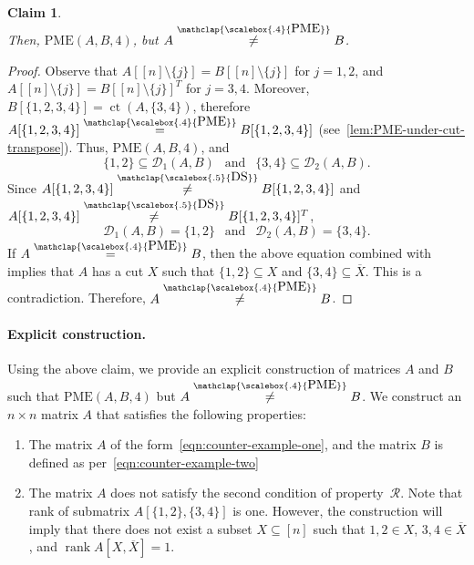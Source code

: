 \documentclass[11pt,letterpaper]{article}
\DeclareMathOperator*{\tw}{ct}
\DeclareMathOperator*{\rank}{rank}
\newcommand{\comp}[1]{\overline{#1}}
\newtheorem{claim}{Claim}[section]
\newcommand{\nDS}{\stackrel{\mathclap{\scalebox{.5}{\mbox{DS}}}}{\neq}}
\newcommand{\PME}{\stackrel{\mathclap{\scalebox{.4}{\mbox{PME}}}}{=}}
\newcommand{\nPME}{\stackrel{\mathclap{\scalebox{.4}{\mbox{PME}}}}{\neq}}
\newcommand{\kPME}[3]{\mathrm{PME}(#1, #2, #3)}
\newcommand{\nsubset}[1]{[n]\setminus\{#1\}}
\newcommand{\calD}{\mathcal{D}}
\newcommand{\prop}{\mathcal{R}}
\begin{document}
{{{{\begin{claim}
\begin{equation}
\end{equation}
Then, $\kPME{A}{B}{4}$, but $A\nPME B$.
\end{claim}
\begin{proof}
Observe that $A[\nsubset{j}]=B[\nsubset{j}]$ for $j=1,2$, and $A[\nsubset{j}]=B[\nsubset{j}]^T$ for $j=3,4$. Moreover, $B[\{1,2,3,4\}]=\tw\left(A, \{3,4\}\right)$, therefore $A[\{1,2,3,4\}]\PME B[\{1,2,3,4\}]$ (see~\cref{lem:PME-under-cut-transpose}). Thus, $\kPME{A}{B}{4}$, and $$\{1,2\}\subseteq \calD_1(A,B)\ \ \text{ and }\ \ \{3,4\}\subseteq \calD_2(A,B).$$ Since $A[\{1,2,3,4\}]\nDS B[\{1,2,3,4\}]$ and $A[\{1,2,3,4\}]\nDS B[\{1,2,3,4\}]^T$, $$ \calD_1(A,B)=\{1,2\}\ \ \text{ and }\ \ \calD_2(A,B)=\{3,4\}.$$ If $A\PME B$, then the above equation combined with~\cite[Theorem~2]{Loewy86} implies that $A$ has a cut $X$ such that $\{1,2\}\subseteq X$ and $\{3,4\}\subseteq \comp{X}$. This is a contradiction. Therefore, $A\nPME B$.
\end{proof}

\paragraph*{Explicit construction.} Using the above claim, we provide an explicit construction of matrices $A$ and $B$ such that $\kPME{A}{B}{4}$ but $A\nPME B$. We construct an $n\times n$ matrix $A$ that satisfies the following properties:
\begin{enumerate}
\item The matrix $A$ of the form~\cref{eqn:counter-example-one}, and the matrix $B$ is defined as per~\cref{eqn:counter-example-two} 
\item  The matrix $A$ does not satisfy the second condition of property~$\prop$. Note that rank of submatrix $ A[\{1,2\}, \{3,4\}]$ is one. However, the construction will imply that there does not exist a subset $X \subseteq [n]$ such that $1,2 \in X$, $3,4 \in \comp{X}$, and $\rank A[X, \comp{X}] = 1$. 
\end{enumerate}

}}}}
\end{document}
